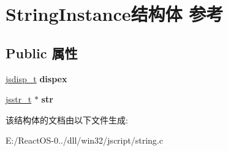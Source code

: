 \hypertarget{struct_string_instance}{}\section{String\+Instance结构体 参考}
\label{struct_string_instance}
\subsection*{Public 属性}
\begin{DoxyCompactItemize}
\item 
\mbox{\label{struct_string_instance_a364b97fd32e93271f7925861ad612d1f}} 
\hyperlink{structjsdisp__t}{jsdisp\+\_\+t} {\bfseries dispex}
\item 
\mbox{\label{struct_string_instance_a78d97f3a76f9b9d90d236ff0fccf936a}} 
\hyperlink{struct__jsstr__t}{jsstr\+\_\+t} $\ast$ {\bfseries str}
\end{DoxyCompactItemize}


该结构体的文档由以下文件生成\+:\begin{DoxyCompactItemize}
\item 
E\+:/\+React\+O\+S-\/0../dll/win32/jscript/string.\+c\end{DoxyCompactItemize}
